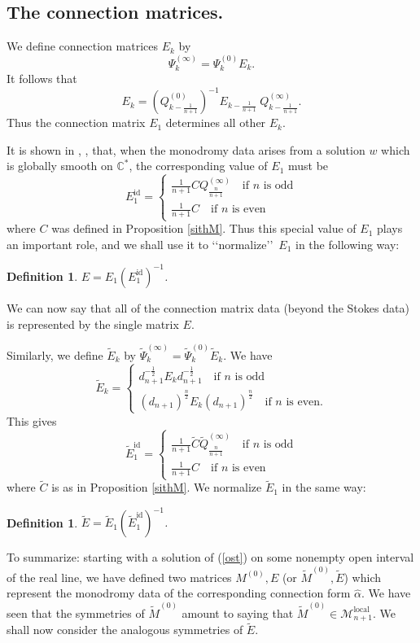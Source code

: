\documentclass[a4paper,12pt,leqno]{amsart}
\numberwithin{equation}{section}
\theoremstyle{plain}
\newtheorem{definition}[theorem]{Definition}
\theoremstyle{definition}
\newcommand{\C}{\mathbb C}
\newcommand{\al}{\alpha}
\DeclareMathOperator{\id}{id}
\newcommand{\cM}{\mathcal{M}}
\renewcommand{\ll}{\lq\lq}
\newcommand{\rr}{\rq\rq\ }
\newcommand{\Psiz}{  \Psi^{(0)}  }
\newcommand{\Psii}{  \Psi^{(\infty)}  }
\newcommand{\Qz}{  Q^{(0)}  }
\newcommand{\Qi}{  Q^{(\infty)}  }
\newcommand{\Mz}{ M^{(0)}  }
\newcommand{\tPsiz}{  \tilde\Psi^{(0)}  }
\newcommand{\tPsii}{  \tilde\Psi^{(\infty)}  }
\newcommand{\tQi}{  \tilde Q^{(\infty)}  }
\newcommand{\tE}{  \tilde E  }
\newcommand{\tMz}{  \tilde M^{(0)}  }
\newcommand{\tC}{  \tilde C }
\begin{document}
\subsection{The connection matrices.}\label{conn}

We define connection matrices  $E_k$ by
\[
\Psii_k=\Psiz_k E_k.
\]
It follows that
\begin{equation*}
E_k = \left(\Qz_{k-\scriptstyle\frac1{n+1}}\right)^{-1}  E_{k-\scriptstyle\frac1{n+1}}
\ \Qi_{k-\scriptstyle\frac1{n+1}}.
\end{equation*}
Thus the connection matrix $E_1$ determines
all other $E_k$.

It is shown in \cite{GIL3}, \cite{GILX}, that, when the monodromy data
arises from a solution $w$ which is
globally smooth on $\C^\ast$, the
corresponding value of $E_1$ must be
\[
E_1^{\id}=
\begin{cases}
\tfrac1{n+1} C \Qi_{\frac n{n+1}} \quad\text{if $n$ is odd}
\\
\tfrac1{n+1} C  \quad\text{if $n$ is even}
\end{cases}
\]
where $C$ was defined in Proposition \ref{sithM}.
Thus this special value of $E_1$
plays an important role, and we shall use it to \ll normalize\rr  $E_1$ in
the following way:
\begin{definition}\label{E}
$E=E_1 (E_1^{\id})^{-1}$.
\end{definition}
We can now say that all of the connection matrix data (beyond the Stokes data) is represented by the single matrix $E$.

Similarly, we define $\tE_k$ by
$\tPsii_k=\tPsiz_k\tE_k$.
We have
\[
\tE_k=
\begin{cases}
d_{n+1}^{-\frac12} E_k d_{n+1}^{-\frac12} \quad\text{if $n$ is odd}
\\
 (d_{n+1})^{\frac n2} E_k (d_{n+1})^{\frac n2} \quad\text{if $n$ is even.}
\end{cases}
\]
This gives
\[
\tE_1^{\id}=
\begin{cases}
\tfrac1{n+1} \tC \tQi_{\frac n{n+1}} \quad\text{if $n$ is odd}
\\
\tfrac1{n+1} C  \quad\text{if $n$ is even}
\end{cases}
\]
where $\tC$ is as in Proposition \ref{sithM}.
We normalize $\tE_1$ in the same way:
\begin{definition}\label{Etilde}
$\tE=\tE_1 (\tE_1^{\id})^{-1}$.
\end{definition}

To summarize: starting with a solution of (\ref{ost}) on some
nonempty open interval of the real line,
we have defined two matrices $\Mz,E$ (or $\tMz,\tE$) which represent the
monodromy data of the corresponding connection form $\hat\al$.
We have seen that the symmetries of $\tMz$ amount to
saying that $\tMz\in \cM_{n+1}^{\text{local}}$.
We shall now consider the analogous
symmetries of $\tE$.
\end{document}
